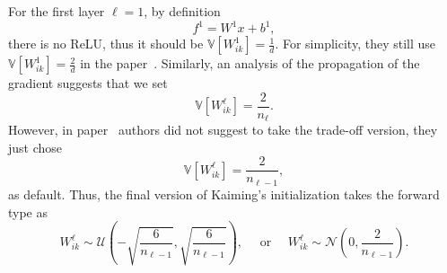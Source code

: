 For the first layer $\ell=1$, by definition
\begin{equation}\label{key}
f^1 = W^1 x + b^1,
\end{equation}
there is no ReLU, thus it should be $\mathbb{V}[W^1_{ik}] = \frac{1}{d}$. 
For simplicity, they still use $\mathbb{V}[W^1_{ik}] = \frac{2}{d}$ in the paper~\cite{he2015delving}. Similarly, an analysis of the propagation of the gradient suggests that we set 
\begin{equation}\label{key}
\mathbb{V}[W^\ell_{ik}] = \frac{2}{n_{\ell}}.
\end{equation}
However, in paper~\cite{he2015delving} authors did not suggest to take the trade-off version, they just chose 
\begin{equation}\label{key}
\mathbb{V}[W^\ell_{ik}] = \frac{2}{n_{\ell-1}},
\end{equation} as default.
Thus, the final version of Kaiming's initialization takes the forward type as
\begin{equation}
W^{\ell}_{ik} \sim \mathcal{U}(-\sqrt{\frac{6}{n_{\ell-1}}}, \sqrt{\frac{6}{n_{\ell-1}}}),
\quad\text{ or }\quad
W^{\ell}_{ik} \sim \mathcal{N}(0,  {\frac{2}{n_{\ell-1}}}).
\end{equation}



